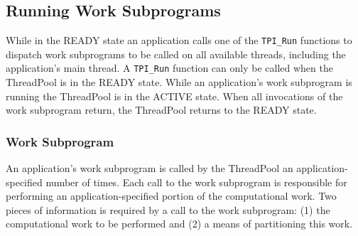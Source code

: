 \clearpage
\subsection{Running Work Subprograms} \label{sec:RunWork}

While in the READY state an application calls one of the \texttt{TPI\_Run} functions to dispatch  work subprograms to be called on all available threads, including the application's main thread.
%
A \texttt{TPI\_Run} function can only be called when the ThreadPool is in the READY state.
%
While an application's work subprogram is running the ThreadPool is in the ACTIVE state.
%
When all invocations of the work subprogram return, the ThreadPool returns to the READY state.



\subsubsection{Work Subprogram}

An application's work subprogram is called by the ThreadPool an application-specified number of times.
%
Each call to the work subprogram is responsible for performing an application-specified portion of the computational work.
%
Two pieces of information is required by a call to the work subprogram:
(1) the computational work to be performed and
(2) a means of partitioning this work.


